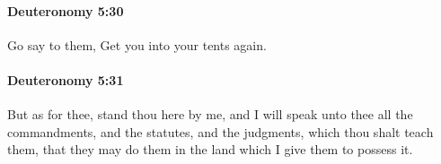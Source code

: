 		\paragraph{Deuteronomy 5:30} %
			\label{DEUTERONOMY-5-30}

			Go say to them, Get you into your tents again.


		\paragraph{Deuteronomy 5:31} %
			\label{DEUTERONOMY-5-31}

			But as for thee, stand thou here by me, and I will speak unto thee all the commandments, and the statutes, and the judgments, which thou shalt teach them, that they may do them in the land which I give them to possess it.


